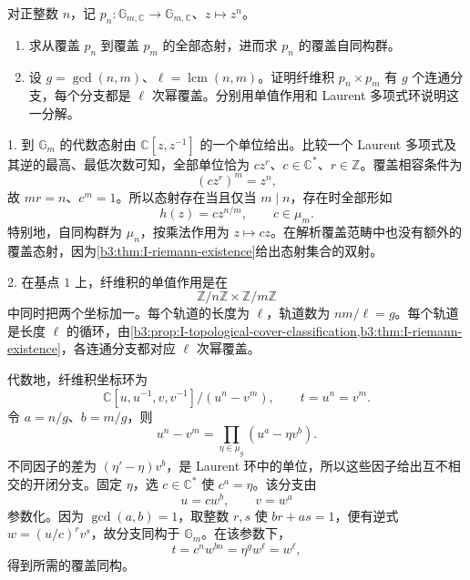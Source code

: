\begin{exercise}\label{b3:ex:I-power-cover-morphisms}
	对正整数 \(n\)，记 \(p_n:\mathbb G_{m,\mathbb C}\rightarrow\mathbb G_{m,\mathbb C}\)、\(z\mapsto z^n\)。
	\begin{enumerate}
		\item 求从覆盖 \(p_n\) 到覆盖 \(p_m\) 的全部态射，进而求 \(p_n\) 的覆盖自同构群。
		\item 设 \(g=\gcd(n,m)\)、\(\ell=\operatorname{lcm}(n,m)\)。证明纤维积 \(p_n\times p_m\) 有 \(g\) 个连通分支，每个分支都是 \(\ell\) 次幂覆盖。分别用单值作用和 Laurent 多项式环说明这一分解。
	\end{enumerate}
\end{exercise}
\begin{solution}
	1. 到 \(\mathbb G_m\) 的代数态射由 \(\mathbb C[z,z^{-1}]\) 的一个单位给出。比较一个 Laurent 多项式及其逆的最高、最低次数可知，全部单位恰为 \(c z^r\)、\(c\in\mathbb C^*\)、\(r\in\mathbb Z\)。覆盖相容条件为
	\[
		(cz^r)^m=z^n,
	\]
	故 \(mr=n\)、\(c^m=1\)。所以态射存在当且仅当 \(m\mid n\)，存在时全部形如
	\[
		h(z)=c z^{n/m},\qquad c\in\mu_m.
	\]
	特别地，自同构群为 \(\mu_n\)，按乘法作用为 \(z\mapsto cz\)。在解析覆盖范畴中也没有额外的覆盖态射，因为\cref{b3:thm:I-riemann-existence}给出态射集合的双射。

	2. 在基点 \(1\) 上，纤维积的单值作用是在
	\[
		\mathbb Z/n\mathbb Z\times\mathbb Z/m\mathbb Z
	\]
	中同时把两个坐标加一。每个轨道的长度为 \(\ell\)，轨道数为 \(nm/\ell=g\)。每个轨道是长度 \(\ell\) 的循环，由\cref{b3:prop:I-topological-cover-classification,b3:thm:I-riemann-existence}，各连通分支都对应 \(\ell\) 次幂覆盖。

	代数地，纤维积坐标环为
	\[
		\mathbb C[u,u^{-1},v,v^{-1}]/(u^n-v^m),
		\qquad t=u^n=v^m.
	\]
	令 \(a=n/g\)、\(b=m/g\)，则
	\[
		u^n-v^m=\prod_{\eta\in\mu_g}(u^a-\eta v^b).
	\]
	不同因子的差为 \((\eta'-\eta)v^b\)，是 Laurent 环中的单位，所以这些因子给出互不相交的开闭分支。固定 \(\eta\)，选 \(c\in\mathbb C^*\) 使 \(c^a=\eta\)。该分支由
	\[
		u=cw^b,\qquad v=w^a
	\]
	参数化。因为 \(\gcd(a,b)=1\)，取整数 \(r,s\) 使 \(br+as=1\)，便有逆式 \(w=(u/c)^r v^s\)，故分支同构于 \(\mathbb G_m\)。在该参数下，
	\[
		t=c^n w^{bn}=\eta^g w^\ell=w^\ell,
	\]
	得到所需的覆盖同构。
\end{solution}

